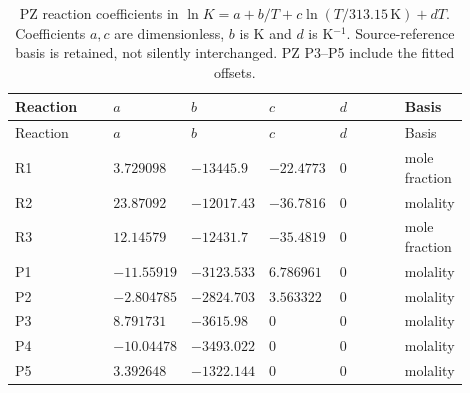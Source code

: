 \begingroup\small\setlength{\tabcolsep}{3pt}
\begin{longtable}{@{}>{\raggedright\arraybackslash}p{0.22\linewidth}>{\raggedright\arraybackslash}p{0.13\linewidth}>{\raggedright\arraybackslash}p{0.13\linewidth}>{\raggedright\arraybackslash}p{0.13\linewidth}>{\raggedright\arraybackslash}p{0.15\linewidth}>{\raggedright\arraybackslash}p{0.14\linewidth}@{}}
\caption{PZ reaction coefficients in $\ln K=a+b/T+c\ln(T/313.15\,\mathrm K)+dT$. Coefficients $a,c$ are dimensionless, $b$ is K and $d$ is K$^{-1}$. Source-reference basis is retained, not silently interchanged. PZ P3--P5 include the fitted offsets.}\label{tab:p2-pz-laws}\\
\toprule Reaction & $a$ & $b$ & $c$ & $d$ & Basis \\ \midrule\endfirsthead
\toprule Reaction & $a$ & $b$ & $c$ & $d$ & Basis \\ \midrule\endhead
\bottomrule\endfoot
R1 & $3.729098$ & $-13445.9$ & $-22.4773$ & $0$ & mole fraction \\
R2 & $23.87092$ & $-12017.43$ & $-36.7816$ & $0$ & molality \\
R3 & $12.14579$ & $-12431.7$ & $-35.4819$ & $0$ & mole fraction \\
P1 & $-11.55919$ & $-3123.533$ & $6.786961$ & $0$ & molality \\
P2 & $-2.804785$ & $-2824.703$ & $3.563322$ & $0$ & molality \\
P3 & $8.791731$ & $-3615.98$ & $0$ & $0$ & molality \\
P4 & $-10.04478$ & $-3493.022$ & $0$ & $0$ & molality \\
P5 & $3.392648$ & $-1322.144$ & $0$ & $0$ & molality \\
\end{longtable}\endgroup
